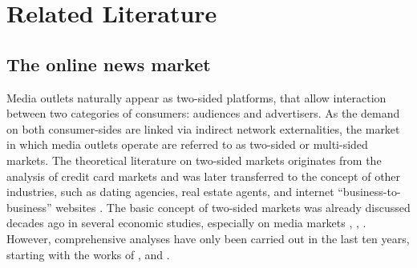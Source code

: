 \documentclass[12pt,a4paper,notitlepage]{article}
\begin{document}
\section{Related Literature}
\subsection{The online news market}

Media outlets naturally appear as two-sided platforms, that allow interaction between two categories of consumers: audiences and advertisers. As the demand on both consumer-sides are linked via indirect network externalities, the market in which media outlets operate are referred to as two-sided or multi-sided markets. The theoretical literature on two-sided markets originates from the analysis of credit card markets \citep{rochet_platform_2003} and was later transferred to the concept of other industries, such as dating agencies, real estate agents, and internet “business-to-business” websites \citep{caillaud_chicken_2003}. The basic concept of two-sided markets was already discussed decades ago in several economic studies, especially on media markets \citep{corden_maximisation_1952}, \citep{gustafsson_circulation_1978}, \citep{blair_pricing_1993}. However, comprehensive analyses have only been carried out in the last ten years, starting with the works of \citet{rochet_platform_2003}, \citet{evans_empirical_2003} and \citet{armstrong_competition_2006}.
\end{document}
